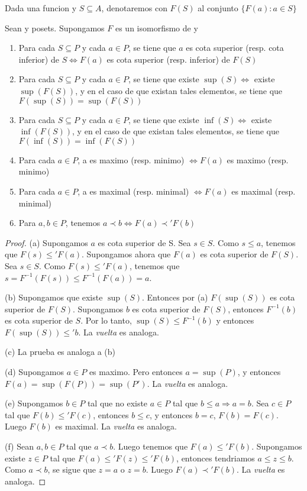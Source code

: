 \begin{definition}
  Dada una funcion  y $S \subseteq A$, denotaremos con $F(S)$ al conjunto ${\{F(a) : a \in S\}}$
\end{definition}

\begin{lemma}
  Sean \poset y  posets. Supongamos $F$ es un isomorfismo de \poset y 
  \begin{enumerate}
    \item Para cada $S \subseteq P$ y cada $a \in P$, se tiene que $a$ es cota superior (resp. cota inferior) de $S \iff F(a)$
    es cota superior (resp. inferior) de $F(S)$
    \item Para cada $S \subseteq P$ y cada $a \in P$, se tiene que existe $\sup(S) \iff$ existe $\sup(F(S))$,
    y en el caso de que existan tales elementos, se tiene que $F(\sup(S)) = \sup(F(S))$
    \item Para cada $S \subseteq P$ y cada $a \in P$, se tiene que existe $\inf(S) \iff$ existe $\inf(F(S))$,
    y en el caso de que existan tales elementos, se tiene que $F(\inf(S)) = \inf(F(S))$
    \item Para cada $a \in P$, a es maximo (resp. minimo) $\iff F(a)$ es maximo (resp. minimo)
    \item Para cada $a \in P$, a es maximal (resp. minimal) $\iff F(a)$ es maximal (resp. minimal)
    \item Para $a, b \in P$, tenemos $a \prec b  \iff F(a) \prec' F(b)$
  \end{enumerate}
\end{lemma}
\begin{proof}
  (a) Supongamos $a$ es cota superior de S. Sea $s \in S$. Como $s \leq a$,
  tenemos que $F(s) \leq' F(a)$. Supongamos ahora que $F(a)$ es cota superior de $F(S)$. Sea $s \in S$.
  Como $F(s) \leq' F(a)$, tenemos que $s = F^{-1}(F(s)) \leq F^{-1}(F(a)) = a$.
  
  (b) Supongamos que existe $\sup(S)$. Entonces por (a) $F(\sup(S))$ es cota superior de $F(S)$.
  Supongamos $b$ es cota superior de $F(S)$, entonces $F^{-1}(b)$ es cota superior de $S$. Por lo tanto,
  $\sup(S) \leq F^{-1}(b)$ y entonces $F(\sup(S)) \leq' b$. La \emph{vuelta} es analoga.
  
  (c) La prueba es analoga a (b)
  
  (d) Supongamos $a \in P$ es maximo. Pero entonces $a = \sup(P)$, y entonces $F(a) = \sup(F(P)) = \sup(P')$.
  La \emph{vuelta} es analoga.

  (e) Supongamos $b \in P$ tal que no existe $a \in P$ tal que $b \leq a \Rightarrow a = b$.  Sea $c \in P$ tal que
  $F(b) \leq' F(c)$, entonces $b \leq c$, y entonces $b = c$, $F(b) = F(c)$. Luego $F(b)$ es maximal.
  La \emph{vuelta} es analoga.

  (f) Sean $a, b \in P$ tal que $a \prec b$. Luego tenemos que $F(a) \leq' F(b)$. Supongamos existe $z \in P$ tal que
  $F(a) \leq' F(z) \leq' F(b)$, entonces tendriamos $a \leq z \leq b$. Como $a \prec b$, se sigue que $z = a$ o $z = b$. Luego $F(a) \prec' F(b)$.
  La \emph{vuelta} es analoga.
\end{proof}

